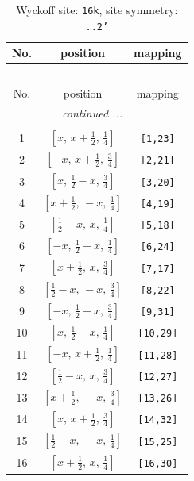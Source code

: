 \documentclass[fleqn,8pt]{jsarticle}
\begin{document}
\begin{longtable}{ccc}
\caption{Wyckoff site: {\tt 16k}, site symmetry: {\tt ..2'}}
 \\
 \hline \hline
No. & position & mapping \\ \hline \endfirsthead

\multicolumn{2}{l}{\tablename\ \thetable{}} \\
 \hline \hline
No. & position & mapping \\ \hline \endhead

 \hline \hline
\multicolumn{2}{r}{\footnotesize\it continued ...} \\ \endfoot

 \hline \hline
\multicolumn{2}{r}{} \\ \endlastfoot

1 & $\left[ x,\, x + \frac{1}{2},\, \frac{1}{4} \right]$ & {\tt [1,23]} \\ \hline
2 & $\left[ - x,\, x + \frac{1}{2},\, \frac{3}{4} \right]$ & {\tt [2,21]} \\ \hline
3 & $\left[ x,\, \frac{1}{2} - x,\, \frac{3}{4} \right]$ & {\tt [3,20]} \\ \hline
4 & $\left[ x + \frac{1}{2},\, - x,\, \frac{1}{4} \right]$ & {\tt [4,19]} \\ \hline
5 & $\left[ \frac{1}{2} - x,\, x,\, \frac{1}{4} \right]$ & {\tt [5,18]} \\ \hline
6 & $\left[ - x,\, \frac{1}{2} - x,\, \frac{1}{4} \right]$ & {\tt [6,24]} \\ \hline
7 & $\left[ x + \frac{1}{2},\, x,\, \frac{3}{4} \right]$ & {\tt [7,17]} \\ \hline
8 & $\left[ \frac{1}{2} - x,\, - x,\, \frac{3}{4} \right]$ & {\tt [8,22]} \\ \hline
9 & $\left[ - x,\, \frac{1}{2} - x,\, \frac{3}{4} \right]$ & {\tt [9,31]} \\ \hline
10 & $\left[ x,\, \frac{1}{2} - x,\, \frac{1}{4} \right]$ & {\tt [10,29]} \\ \hline
11 & $\left[ - x,\, x + \frac{1}{2},\, \frac{1}{4} \right]$ & {\tt [11,28]} \\ \hline
12 & $\left[ \frac{1}{2} - x,\, x,\, \frac{3}{4} \right]$ & {\tt [12,27]} \\ \hline
13 & $\left[ x + \frac{1}{2},\, - x,\, \frac{3}{4} \right]$ & {\tt [13,26]} \\ \hline
14 & $\left[ x,\, x + \frac{1}{2},\, \frac{3}{4} \right]$ & {\tt [14,32]} \\ \hline
15 & $\left[ \frac{1}{2} - x,\, - x,\, \frac{1}{4} \right]$ & {\tt [15,25]} \\ \hline
16 & $\left[ x + \frac{1}{2},\, x,\, \frac{1}{4} \right]$ & {\tt [16,30]} \\
\end{longtable}
\end{document}
